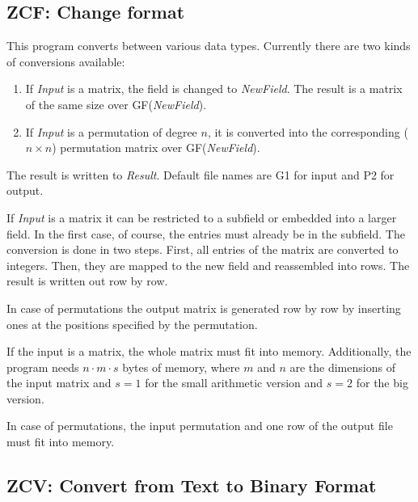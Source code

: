 \subsection{ZCF: Change format}\label{sec:zcf} 
\Syntax
{}

\Description
This program converts between various data types. Currently
there are two kinds of conversions available:
\begin{enumerate}
\item
	If {\it Input} is a matrix, the field is changed to
	{\it NewField}. The result is a matrix of the same
	size over GF({\it NewField}).
\item
	If {\it Input} is a permutation of degree $n$, it is
	converted into the corresponding ($n\times n$) permutation
	matrix over GF({\it NewField}).
\end{enumerate}
The result is written to {\it Result}.  Default file names are G1
for input and P2 for output.

If {\it Input} is a matrix it can be restricted to a subfield or
embedded into a larger field. In the first case, of course, the
entries must already be in the subfield. The conversion is done in two
steps. First, all entries of the matrix are converted to integers.
Then, they are mapped to the new field and reassembled into rows.
The result is written out row by row.

In case of permutations the output matrix is generated row by
row by inserting ones at the positions specified by the
permutation.


\Limits
If the input is a matrix, the whole matrix must fit into memory.
Additionally, the
program needs $n\cdot m\cdot s$ bytes of memory, where $m$ and $n$
are the dimensions of the input matrix and $s=1$ for the small
arithmetic version and $s=2$ for the big version.

In case of permutations, the input permutation and one row
of the output file must fit into memory.


\subsection{ZCV: Convert from Text to Binary Format}\label{sec:zcv}
\Syntax
{}

